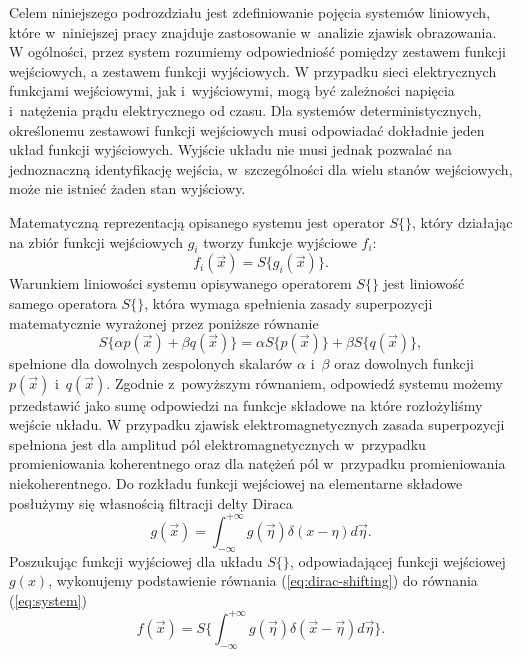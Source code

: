 Celem niniejszego podrozdziału jest zdefiniowanie pojęcia systemów liniowych, które w~niniejszej pracy znajduje zastosowanie w~analizie zjawisk obrazowania. W ogólności, przez system rozumiemy odpowiedniość pomiędzy zestawem funkcji wejściowych, a zestawem funkcji wyjściowych. W przypadku sieci elektrycznych funkcjami wejściowymi, jak i~wyjściowymi, mogą być zależności napięcia i~natężenia prądu elektrycznego od czasu. Dla systemów deterministycznych, określonemu zestawowi funkcji wejściowych musi odpowiadać dokładnie jeden układ funkcji wyjściowych. Wyjście układu nie musi jednak pozwalać na jednoznaczną identyfikację wejścia, w~szczególności dla wielu stanów wejściowych, może nie istnieć żaden stan wyjściowy.
\label{art:lsi}

Matematyczną reprezentacją opisanego systemu jest operator $S\{\}$, który działając na zbiór funkcji wejściowych $g_i$ tworzy funkcje wyjściowe $f_i$:
\begin{equation}
f_i(\vec{x})=S\{g_i(\vec{x})\}.
\label{eq:system}
\end{equation} 
Warunkiem liniowości systemu opisywanego operatorem $S\{\}$ jest liniowość samego operatora $S\{\}$, która wymaga spełnienia zasady superpozycji matematycznie wyrażonej przez poniższe równanie
\begin{equation}
S\{\alpha p(\vec{x}) + \beta q(\vec{x})\} = \alpha S\{p(\vec{x})\} + \beta S\{q(\vec{x})\},
\label{eq:lin-system}
\end{equation}
spełnione dla dowolnych zespolonych skalarów $\alpha$ i~$\beta$ oraz dowolnych funkcji $p(\vec{x})$ i~$q(\vec{x})$. Zgodnie z~powyższym równaniem, odpowiedź systemu możemy przedstawić jako sumę odpowiedzi na funkcje składowe na które rozłożyliśmy wejście układu. W przypadku zjawisk elektromagnetycznych zasada superpozycji spełniona jest dla amplitud pól elektromagnetycznych w~przypadku promieniowania koherentnego oraz dla natężeń pól w~przypadku promieniowania niekoherentnego. Do rozkładu funkcji wejściowej na elementarne składowe posłużymy się własnością filtracji delty Diraca
\begin{equation}
g(\vec{x})=\int_{-\infty}^{+\infty} g(\vec{\eta}) \delta(x-\eta) d \vec{\eta}.
\label{eq:dirac-shifting}
\end{equation}
Poszukując funkcji wyjściowej dla układu $S\{\}$, odpowiadającej funkcji wejściowej $g(x)$, wykonujemy podstawienie równania (\ref{eq:dirac-shifting}) do równania (\ref{eq:system}) 
\begin{equation}
f(\vec{x})=S \Bigg\{\int_{-\infty}^{+\infty} g(\vec{\eta}) \delta(\vec{x}-\vec{\eta}) d \vec{\eta} \Bigg\}.
\label{eq:dirac-shift2}
\end{equation}
